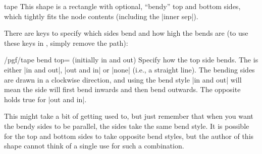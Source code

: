 \begin{shape}{tape}
	This shape is a rectangle with optional, ``bendy'' top and bottom
	sides, which tightly fits the node contents (including the
	|inner sep|).
	
\begin{codeexample}[]
\end{codeexample}

  There are \pgfname{} keys to specify which sides bend and how high
  the bends are (to use these keys in \tikzname{}, simply remove the
   path):

  \begin{key}{/pgf/tape bend top= (initially in and out)}
  	Specify how the top side bends. The  is either
  	|in and out|, |out and in| or |none| (i.e., a straight line).
  	The bending sides are drawn in a
  	clockwise direction, and using the bend style |in and out| will mean
  	the side will first	bend inwards and then bend outwards.
  	The opposite holds true for	|out and in|.
  	
\begin{codeexample}[]
\end{codeexample}

    This might take a bit of getting used to, but just remember that
    when you want the bendy sides to be parallel, the sides take the
    same bend style. It is possible for the top and bottom sides to
    take opposite bend styles, but the author of this shape cannot
    think of a single use for such a combination.

\begin{codeexample}[]
\end{codeexample}


\end{key}
\end{shape}
